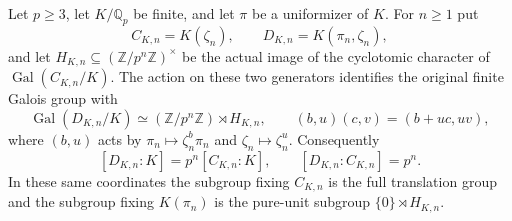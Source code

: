 \begin{lemma}
\label{ft:diagonal-finite-affine-structure}
\leanok
{}
Let $p\geq3$, let $K/\mathbb Q_p$ be finite, and let $\pi$ be a
uniformizer of $K$. For $n\geq1$ put
\[
 C_{K,n}=K(\zeta_n),\qquad D_{K,n}=K(\pi_n,\zeta_n),
\]
and let $H_{K,n}\subseteq(\mathbb Z/p^n\mathbb Z)^\times$ be the
actual image of the cyclotomic character of $\operatorname{Gal}(C_{K,n}/K)$.
The action on these two generators identifies the original finite
Galois group with
\[
 \operatorname{Gal}(D_{K,n}/K)
 \simeq (\mathbb Z/p^n\mathbb Z)\rtimes H_{K,n},
 \qquad (b,u)(c,v)=(b+uc,uv),
\]
where $(b,u)$ acts by
$\pi_n\mapsto\zeta_n^b\pi_n$ and $\zeta_n\mapsto\zeta_n^u$.
Consequently
\[
 [D_{K,n}:K]=p^n[C_{K,n}:K],\qquad
 [D_{K,n}:C_{K,n}]=p^n.
\]
In these same coordinates the subgroup fixing $C_{K,n}$ is the full
translation group and the subgroup fixing $K(\pi_n)$ is the pure-unit
subgroup $\{0\}\rtimes H_{K,n}$.
\end{lemma}
